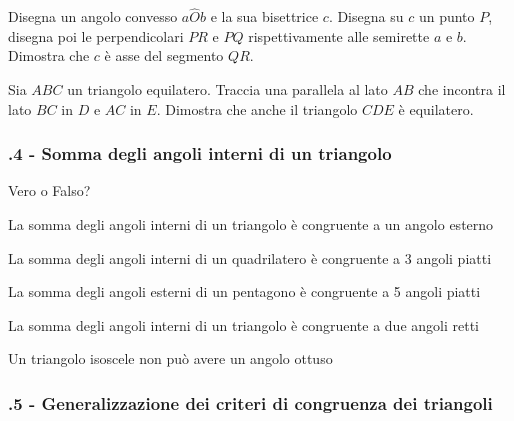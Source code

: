 \begin{multicols}{2}
\begin{esercizio}
\label{ese:3.43}
Disegna un angolo convesso $a\widehat{O}b$ e la sua bisettrice $c$. Disegna su $c$ un punto $P$, disegna poi le perpendicolari $PR$ e $PQ$ rispettivamente alle semirette $a$ e $b$. Dimostra che $c$ è asse del segmento $QR$.
\end{esercizio}

\begin{esercizio}
\label{ese:3.44}
Sia $ABC$ un triangolo equilatero. Traccia una parallela al lato $AB$ che incontra il lato $BC$ in $D$ e $AC$ in $E$. Dimostra che anche il triangolo $CDE$ è equilatero.
\end{esercizio}
\end{multicols}

\subsubsection*{\thechapter.4 - Somma degli angoli interni di un triangolo}

\begin{esercizio}
\label{ese:3.45}
Vero o Falso?
\begin{enumeratea}
\item La somma degli angoli interni di un triangolo è congruente a un angolo esterno\tab\tab\hfill\boxV\quad\boxF
\item La somma degli angoli interni di un quadrilatero è congruente a 3 angoli piatti\tab\tab\hfill\boxV\quad\boxF
\item La somma degli angoli esterni di un pentagono è congruente a 5 angoli piatti\hfill\boxV\quad\boxF
\item La somma degli angoli interni di un triangolo è congruente a due angoli retti\hfill\boxV\quad\boxF
\item Un triangolo isoscele non può avere un angolo ottuso\hfill\boxV\quad\boxF
\end{enumeratea}
\end{esercizio}

\subsubsection*{\thechapter.5 - Generalizzazione dei criteri di congruenza dei triangoli}

